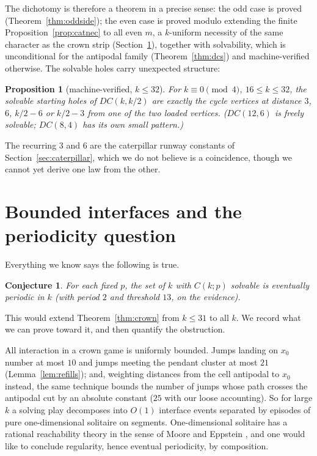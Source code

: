 \documentclass[11pt]{article}
\newtheorem{proposition}[theorem]{Proposition}
\newtheorem{conjecture}[theorem]{Conjecture}
\theoremstyle{definition}
\begin{document}
The dichotomy is therefore a theorem in a precise sense: the odd case
is proved (Theorem~\ref{thm:oddside}); the even case is proved modulo
extending the finite Proposition~\ref{prop:catnec} to all even $m$, a
$k$-uniform necessity of the same character as the crown strip
(Section~\ref{sec:periodicity}), together with solvability, which is
unconditional for the antipodal family (Theorem~\ref{thm:dcs}) and
machine-verified otherwise. The solvable holes carry unexpected
structure:

\begin{proposition}[machine-verified, $k\le 32$]\label{prop:distlaw}
For $k\equiv0\pmod4$, $16\le k\le32$, the solvable starting holes
of $DC(k,k/2)$ are exactly the cycle vertices at distance
$3$, $6$, $k/2-6$ or $k/2-3$ from one of the two loaded vertices.
($DC(12,6)$ is freely solvable; $DC(8,4)$ has its own small
pattern.)
\end{proposition}

The recurring $3$ and $6$ are the caterpillar runway constants of
Section~\ref{sec:caterpillar}, which we do not believe is a
coincidence, though we cannot yet derive one law from the other.

\section{Bounded interfaces and the periodicity question}
\label{sec:periodicity}

Everything we know says the following is true.

\begin{conjecture}\label{conj:periodic}
For each fixed $p$, the set of $k$ with $C(k;p)$ solvable is
eventually periodic in $k$ (with period $2$ and threshold $13$, on
the evidence).
\end{conjecture}

This would extend Theorem~\ref{thm:crown} from $k\le31$ to all $k$.
We record what we can prove toward it, and then quantify the
obstruction.

All interaction in a crown game is uniformly bounded. Jumps
landing on $x_0$ number at most $10$ and jumps meeting the pendant
cluster at most $21$ (Lemma~\ref{lem:refills}); and, weighting
distances from the cell antipodal to $x_0$ instead, the same
technique bounds the number of jumps whose path crosses the
antipodal cut by an absolute constant ($25$ with our loose
accounting). So for large $k$ a solving play decomposes into $O(1)$
interface events separated by episodes of pure one-dimensional
solitaire on segments. One-dimensional solitaire has a rational
reachability theory in the sense of Moore and Eppstein \cite{ME},
and one would like to conclude regularity, hence eventual
periodicity, by composition.
\end{document}
